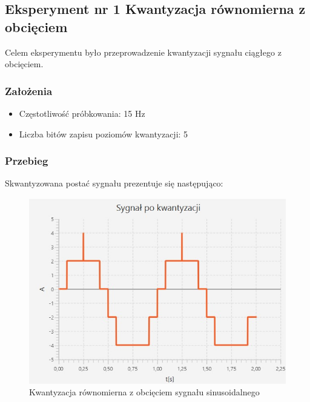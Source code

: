 \documentclass[12pt]{article}
\begin{document}
\subsection{Eksperyment nr 1 Kwantyzacja równomierna z obcięciem}

Celem eksperymentu było przeprowadzenie kwantyzacji sygnału ciągłego z obcięciem.

\subsubsection{Założenia}

\begin{itemize}
    \item Częstotliwość próbkowania: 15 Hz
    \item Liczba bitów zapisu poziomów kwantyzacji: 5
\end{itemize}
\subsubsection{Przebieg}
Skwantyzowana postać sygnału prezentuje się następująco:
\begin{figure}[H]
    \centering
	\includegraphics[width=\linewidth]{kwantyzacja_z_obcieciem.jpg}
    \caption{Kwantyzacja równomierna z obcięciem sygnału sinusoidalnego}
    \label{wykres dla eksperymentu 1}
\end{figure}
\end{document}

